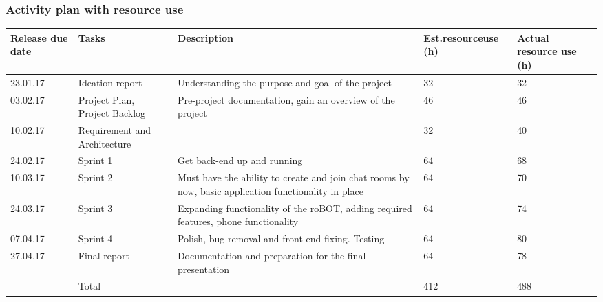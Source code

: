 \subsubsection{Activity plan with resource use}
\label{sec:act.plan w resources}
\begin{adjustbox}{center}
\begin{tabular}{ p{0.1\paperwidth} | p{0.1\paperwidth} | p{} | p{0.1\paperwidth} | p{0.1\paperwidth} }
    Release due date 
    & Tasks 
    & Description
    & Est.\newline resource\newline use (h)
    & Actual \newline resource \newline use (h)\\ \hline
    23.01.17 
    & Ideation report
    & Understanding the purpose and goal of the project
    & 32
    & 32 \\ \hline
    03.02.17
    & Project Plan, Project Backlog
    & Pre-project documentation, gain an overview of the project
    & 46
    & 46 \\ \hline
    10.02.17
    & Requirement and Architecture
    & 
    & 32 
    & 40 \\ \hline
    24.02.17
    & Sprint 1
    & Get back-end up and running
    & 64 
    & 68 \\ \hline
    
    10.03.17
    & Sprint 2
    & Must have the ability to create and join chat rooms by now, basic application functionality in place
    & 64 
    & 70 \\ \hline
    24.03.17
    & Sprint 3
    & Expanding functionality of the roBOT, adding required features, phone functionality
    & 64
    & 74 \\ \hline
    07.04.17
    & Sprint 4
    & Polish, bug removal and front-end fixing. Testing
    & 64
    & 80 \\ \hline
    27.04.17
    & Final report
    & Documentation and preparation for the final presentation
    & 64
    & 78 \\ \hline
    & Total
    & 
    & 412
    & 488
\end{tabular}
\end{adjustbox}

